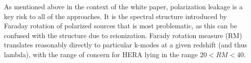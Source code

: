 \documentclass[preprint]{aastex}
\begin{document}
As mentioned above in the context of the white paper, polarization leakage is a key risk to all of the approaches.  
It is the spectral structure introduced by Faraday rotation of polarized sources that is most problematic, as this can be confused with the structure due to reionization.  
Farady rotation measure (RM) translates reasonably directly to particular k-modes at a given redshift (and thus lambda), with the range of concern for HERA lying in the range $20 < RM < 40$.
% 
% 
\end{document}
